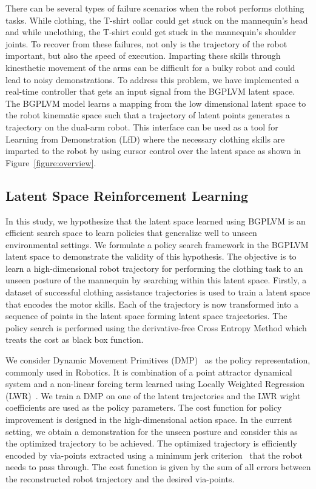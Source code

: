 \documentclass{article}
\begin{document}
There can be several types of failure scenarios when the robot performs clothing tasks. While clothing, the T-shirt collar could get stuck on the mannequin's head and while unclothing, the T-shirt could get stuck in the mannequin's shoulder joints. To recover from these failures, not only is the trajectory of the robot important, but also the speed of execution. Imparting these skills through kinesthetic movement of the arms can be difficult for a bulky robot and could lead to noisy demonstrations. To address this problem, we have implemented a real-time controller that gets an input signal from the BGPLVM latent space. The BGPLVM model learns a mapping from the low dimensional latent space to the robot kinematic space such that a trajectory of latent points generates a trajectory on the dual-arm robot. This interface can be used as a tool for Learning from Demonstration (LfD) where the necessary clothing skills are imparted to the robot by using cursor control over the latent space as shown in Figure~\ref{figure:overview}.

\subsection{Latent Space Reinforcement Learning}
\label{section:latentrl}

In this study, we hypothesize that the latent space learned using BGPLVM is an efficient search space to learn policies that generalize well to unseen environmental settings. We formulate a policy search framework in the BGPLVM latent space to demonstrate the validity of this hypothesis. The objective is to learn a high-dimensional robot trajectory for performing the clothing task to an unseen posture of the mannequin by searching within this latent space. Firstly, a dataset of successful clothing assistance trajectories is used to train a latent space that encodes the motor skills. Each of the trajectory is now transformed into a sequence of points in the latent space forming latent space trajectories. The policy search is performed using the derivative-free Cross Entropy Method which treats the cost as black box function.

We consider Dynamic Movement Primitives (DMP)~\cite{dmp} as the policy representation, commonly used in Robotics. It is combination of a point attractor dynamical system and a non-linear forcing term learned using Locally Weighted Regression (LWR)~\cite{lwr}. We train a DMP on one of the latent trajectories and the LWR wight coefficients are used as the policy parameters. The cost function for policy improvement is designed in the high-dimensional action space. In the current setting, we obtain a demonstration for the unseen posture and consider this as the optimized trajectory to be achieved. The optimized trajectory is efficiently encoded by via-points extracted using a minimum jerk criterion~\cite{via} that the robot needs to pass through. The cost function is given by the sum of all errors between the reconstructed robot trajectory and the desired via-points.
\end{document}
